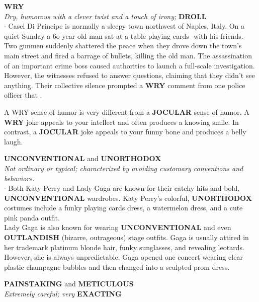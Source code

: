 \documentclass{exam}
\begin{document}
\begin{questions}
\question \textbf{WRY} \\
\textit{Dry, humorous with a clever twist and a touch of irony;} \textbf{DROLL}\\

$\cdot$ Casel Di Principe is normally a sleepy town northwest of Naples, Italy. On a quiet Sunday a 6o-year-old man sat at a table playing cards -with his friends. Two
gunmen suddenly shattered the peace when they
drove down the town's main street and fired a barrage
of bullets, killing the old man. The assassination of an
important crime boss caused authorities to launch a
full-scale investigation. However, the witnesses refused to answer questions, claiming that they didn't see anything. Their collective silence prompted a \textbf{WRY} comment from one police officer that .\\

\begin{tcolorbox}
A WRY sense of humor is very different from a
\textbf{JOCULAR} sense of humor. A \textbf{WRY} joke appeals
to your intellect and often produces a knowing
smile. In contrast, a \textbf{JOCULAR} joke appeals to
your funny bone and produces a belly laugh.
\end{tcolorbox}

\question \textbf{UNCONVENTIONAL} and
\textbf{UNORTHODOX}\\ \textit{Not ordinary or typical; characterized by
avoiding customary conventions and behaviors.}\\

$\cdot$ Both Katy Perry and Lady Gaga are known for their
catchy hits and bold, \textbf{UNCONVENTIONAL}
wardrobes. Katy Perry's colorful, \textbf{UNORTHODOX}
costumes include a funky playing cards dress, a
watermelon dress, and a cute pink panda outfit.\\

Lady Gaga is also known for wearing
\textbf{UNCONVENTIONAL} and even \textbf{OUTLANDISH}
(bizarre, outrageous) stage outfits. Gaga is usually
attired in her trademark platinum blonde hair, funky
sunglasses, and revealing leotards. However, she is
always unpredictable. Gaga opened one concert
wearing clear plastic champagne bubbles and then
changed into a sculpted prom dress.

\question \textbf{PAINSTAKING} and \textbf{METICULOUS}\\ \textit{Extremely careful; very} \textbf{EXACTING}\\


\end{questions}
\end{document}
